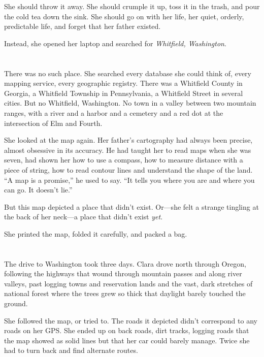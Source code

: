 \documentclass[
    language=english,
    doctype=short-story,
    institution=none,
]{../../omnilatex}
\begin{document}
She should throw it away. She should crumple it up, toss it in the trash, and pour the cold tea down the sink. She should go on with her life, her quiet, orderly, predictable life, and forget that her father existed.

Instead, she opened her laptop and searched for \textit{Whitfield, Washington}.

\section*{}

There was no such place. She searched every database she could think of, every mapping service, every geographic registry. There was a Whitfield County in Georgia, a Whitfield Township in Pennsylvania, a Whitfield Street in several cities. But no Whitfield, Washington. No town in a valley between two mountain ranges, with a river and a harbor and a cemetery and a red dot at the intersection of Elm and Fourth.

She looked at the map again. Her father's cartography had always been precise, almost obsessive in its accuracy. He had taught her to read maps when she was seven, had shown her how to use a compass, how to measure distance with a piece of string, how to read contour lines and understand the shape of the land. ``A map is a promise,'' he used to say. ``It tells you where you are and where you can go. It doesn't lie.''

But this map depicted a place that didn't exist. Or---she felt a strange tingling at the back of her neck---a place that didn't exist \textit{yet}.

She printed the map, folded it carefully, and packed a bag.

\section*{}

The drive to Washington took three days. Clara drove north through Oregon, following the highways that wound through mountain passes and along river valleys, past logging towns and reservation lands and the vast, dark stretches of national forest where the trees grew so thick that daylight barely touched the ground.

She followed the map, or tried to. The roads it depicted didn't correspond to any roads on her GPS. She ended up on back roads, dirt tracks, logging roads that the map showed as solid lines but that her car could barely manage. Twice she had to turn back and find alternate routes.
\end{document}
